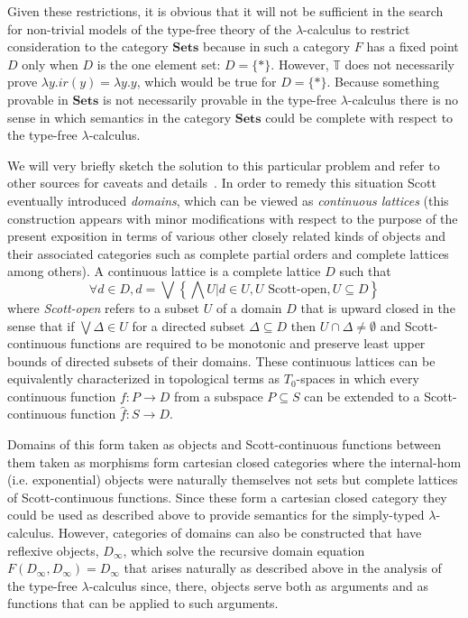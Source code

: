 Given these restrictions, it is obvious that it will not be sufficient in the search for non-trivial models of the type-free theory of the $\lambda$-calculus to restrict consideration to the category $\mathbf{Sets}$ because in such a category $F$ has a fixed point $D$ only when $D$ is the one element set: $D = \{*\}$. However, $\mathbb{T}$ does not necessarily prove $\lambda y.ir(y)=\lambda y.y$, which would be true for $D = \{*\}$. Because something provable in $\mathbf{Sets}$ is not necessarily provable in the type-free $\lambda$-calculus there is no sense in which semantics in the category $\mathbf{Sets}$ could be complete with respect to the type-free $\lambda$-calculus.

We will very briefly sketch the solution to this particular problem and refer to other sources for caveats and details~\cite{Barendregt1985,Smyth1982,Freyd1990,Abramsky1995,Cattani2007}. In order to remedy this situation Scott eventually introduced \emph{domains}, which can be viewed as \emph{continuous lattices} (this construction appears with minor modifications with respect to the purpose of the present exposition in terms of various other closely related kinds of objects and their associated categories such as complete partial orders and complete lattices among others). A continuous lattice is a complete  lattice $D$ such that
$$
\forall d \in D, d = \bigvee \left\{ \bigwedge U | d \in U, U \mbox{ Scott-open}, U \subseteq D \right\}
$$
where \emph{Scott-open} refers to a subset $U$ of a domain $D$ that is upward closed in the sense that if $\bigvee \Delta \in U$ for a directed subset $\Delta \subseteq D$ then $U \cap \Delta \neq \emptyset$ and Scott-continuous functions are required to be monotonic and preserve least upper bounds of directed subsets of their domains. These continuous lattices can be equivalently characterized in topological terms as $T_0$-spaces in which every continuous function $f \colon P \rightarrow D$ from a subspace $P \subseteq S$ can be extended to a Scott-continuous function $\hat{f} \colon S \rightarrow D$.

Domains of this form taken as objects and Scott-continuous functions between them taken as morphisms form cartesian closed categories where the internal-hom (i.e. exponential) objects were naturally themselves not sets but complete lattices of Scott-continuous functions. Since these form a cartesian closed category they could be used as described above to provide semantics for the simply-typed $\lambda$-calculus. However, categories of domains can also be constructed that have reflexive objects, $D_\infty$, which solve the recursive domain equation $F(D_{\infty},D_{\infty})=D_{\infty}$ that arises naturally as described above in the analysis of the type-free $\lambda$-calculus since, there, objects serve both as arguments and as functions that can be applied to such arguments.

